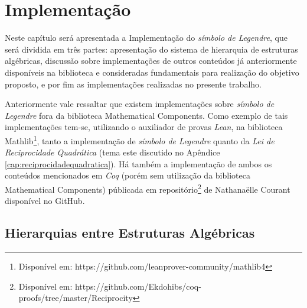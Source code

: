 \chapter{Implementação}
\label{cap:implementacao}

Neste capítulo será apresentada a Implementação do \textit{símbolo de Legendre}, que será dividida em três partes: apresentação do sistema de hierarquia de estruturas algébricas, discussão sobre implementações de outros conteúdos já anteriormente disponíveis na biblioteca e consideradas fundamentais para realização do objetivo proposto, e por fim as implementações realizadas no presente trabalho.
        
Anteriormente vale ressaltar que existem implementações sobre \textit{símbolo de Legendre} fora da biblioteca Mathematical Components. Como exemplo de tais implementações tem-se, utilizando o auxiliador de provas \textit{Lean}, na biblioteca Mathlib\footnote{Disponível em: https://github.com/leanprover-community/mathlib4}, tanto a implementação de \textit{símbolo de Legendre} quanto da \textit{Lei de Reciprocidade Quadrática}
(tema este discutido no Apêndice \ref{cap:reciprocidadequadratica}). Há também a implementação de ambos os conteúdos mencionados em \textit{Coq} (porém sem utilização da biblioteca Mathematical Components) públicada em repositório\footnote{Disponível em: https://github.com/Ekdohibs/coq-proofs/tree/master/Reciprocity} de Nathanaëlle Courant disponível no GitHub.

\section{Hierarquias entre Estruturas Algébricas}

